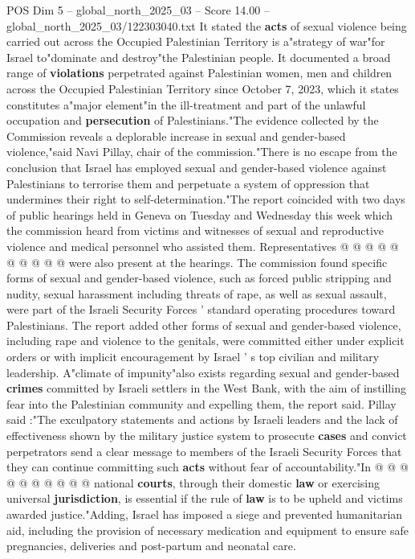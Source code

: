 \begin{textsample}{POS Dim 5 – global\_north\_2025\_03 – Score 14.00 – global\_north\_2025\_03/122303040.txt}  \label{ex:f5_pos_204}
It stated the \textbf{acts} of sexual violence being carried out across the Occupied Palestinian Territory is a"strategy of war"for Israel to"dominate and destroy"the Palestinian people.
It documented a broad range of \textbf{violations} perpetrated against Palestinian women, men and children across the Occupied Palestinian Territory since October 7, 2023, which it states constitutes a"major element"in the ill-treatment and part of the unlawful occupation and \textbf{persecution} of Palestinians."The evidence collected by the Commission reveals a deplorable increase in sexual and gender-based violence,"said Navi Pillay, chair of the commission."There is no escape from the conclusion that Israel has employed sexual and gender-based violence against Palestinians to terrorise them and perpetuate a system of oppression that undermines their right to self-determination."The report coincided with two days of public hearings held in Geneva on Tuesday and Wednesday this week which the commission heard from victims and witnesses of sexual and reproductive violence and medical personnel who assisted them.
Representatives @ @ @ @ @ @ @ @ @ @ were also present at the hearings.
The commission found specific forms of sexual and gender-based violence, such as forced public stripping and nudity, sexual harassment including threats of rape, as well as sexual assault, were part of the Israeli Security Forces ' standard operating procedures toward Palestinians.
The report added other forms of sexual and gender-based violence, including rape and violence to the genitals, were committed either under explicit orders or with implicit encouragement by Israel ' s top civilian and military leadership.
A"climate of impunity"also exists regarding sexual and gender-based \textbf{crimes} committed by Israeli settlers in the West Bank, with the aim of instilling fear into the Palestinian community and expelling them, the report said.
Pillay said :"The exculpatory statements and actions by Israeli leaders and the lack of effectiveness shown by the military justice system to prosecute \textbf{cases} and convict perpetrators send a clear message to members of the Israeli Security Forces that they can continue committing such \textbf{acts} without fear of accountability."In @ @ @ @ @ @ @ @ @ @ national \textbf{courts}, through their domestic \textbf{law} or exercising universal \textbf{jurisdiction}, is essential if the rule of \textbf{law} is to be upheld and victims awarded justice."Adding, Israel has imposed a siege and prevented humanitarian aid, including the provision of necessary medication and equipment to ensure safe pregnancies, deliveries and post-partum and neonatal care.

\end{textsample}
